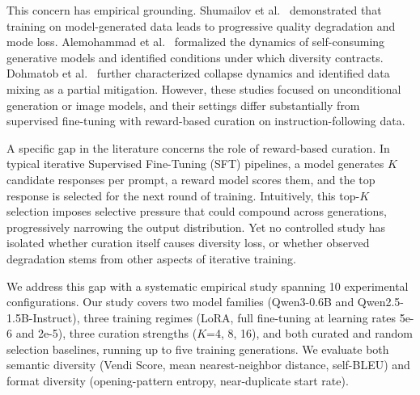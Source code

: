 \documentclass[11pt,a4paper]{article}
\begin{document}
This concern has empirical grounding. Shumailov et al.~\cite{shumailov2024curse} demonstrated that training on model-generated data leads to progressive quality degradation and mode loss. Alemohammad et al.~\cite{alemohammad2024self} formalized the dynamics of self-consuming generative models and identified conditions under which diversity contracts. Dohmatob et al.~\cite{dohmatob2024tale} further characterized collapse dynamics and identified data mixing as a partial mitigation. However, these studies focused on unconditional generation or image models, and their settings differ substantially from supervised fine-tuning with reward-based curation on instruction-following data.

A specific gap in the literature concerns the role of reward-based curation. In typical iterative Supervised Fine-Tuning (SFT) pipelines, a model generates $K$ candidate responses per prompt, a reward model scores them, and the top response is selected for the next round of training. Intuitively, this top-$K$ selection imposes selective pressure that could compound across generations, progressively narrowing the output distribution. Yet no controlled study has isolated whether curation itself causes diversity loss, or whether observed degradation stems from other aspects of iterative training.

We address this gap with a systematic empirical study spanning 10 experimental configurations. Our study covers two model families (Qwen3-0.6B and Qwen2.5-1.5B-Instruct), three training regimes (LoRA, full fine-tuning at learning rates 5e-6 and 2e-5), three curation strengths ($K$=4, 8, 16), and both curated and random selection baselines, running up to five training generations. We evaluate both semantic diversity (Vendi Score, mean nearest-neighbor distance, self-BLEU) and format diversity (opening-pattern entropy, near-duplicate start rate).
\end{document}
